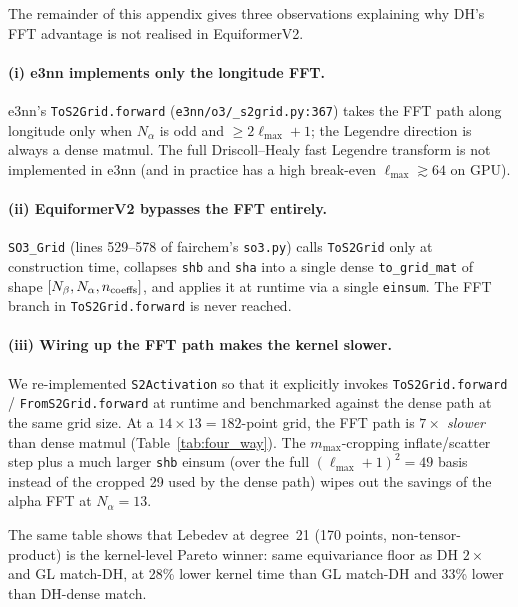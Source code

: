 \documentclass{article}
\begin{document}
The remainder of this appendix gives three observations explaining
why DH's FFT advantage is not realised in EquiformerV2.

\paragraph{(i) e3nn implements only the longitude FFT.}
e3nn's \texttt{ToS2Grid.forward} (\texttt{e3nn/o3/\_s2grid.py:367})
takes the FFT path along longitude only when $N_\alpha$ is odd and
$\geq 2\ell_{\max}+1$; the Legendre direction is always a dense
matmul. The full Driscoll--Healy fast Legendre transform is not
implemented in e3nn (and in practice has a high break-even
$\ell_{\max} \gtrsim 64$ on GPU).

\paragraph{(ii) EquiformerV2 bypasses the FFT entirely.}
\texttt{SO3\_Grid} (lines 529--578 of fairchem's \texttt{so3.py})
calls \texttt{ToS2Grid} only at construction time, collapses
\texttt{shb} and \texttt{sha} into a single dense
\texttt{to\_grid\_mat} of shape $[N_\beta, N_\alpha, n_{\rm coeffs}]$,
and applies it at runtime via a single \texttt{einsum}. The FFT
branch in \texttt{ToS2Grid.forward} is never reached.

\paragraph{(iii) Wiring up the FFT path makes the kernel slower.}
We re-implemented \texttt{S2Activation} so that it explicitly invokes
\texttt{ToS2Grid.forward} / \texttt{FromS2Grid.forward} at runtime
and benchmarked against the dense path at the same grid size. At a
$14 \times 13 = 182$-point grid, the FFT path is \emph{$7\times$
slower} than dense matmul (Table~\ref{tab:four_way}). The
$m_{\max}$-cropping inflate/scatter step plus a much larger
\texttt{shb} einsum (over the full $(\ell_{\max}+1)^2 = 49$ basis
instead of the cropped 29 used by the dense path) wipes out the
savings of the alpha FFT at $N_\alpha = 13$.

The same table shows that Lebedev at degree~21 (170 points,
non-tensor-product) is the kernel-level Pareto winner: same
equivariance floor as DH $2\times$ and GL match-DH, at 28\% lower
kernel time than GL match-DH and 33\% lower than DH-dense match.
\end{document}
